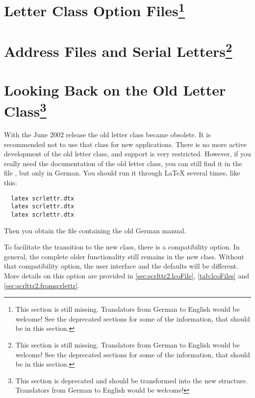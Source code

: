 \section{Letter Class Option Files\protect\footnote{This section is still missing. Translators
    from German to English would be welcome! See the deprecated sections for
    some of the information, that should be in this section.}}
\label{sec:scrlttr2.stillmissing}
\mbox{}

\section{Address Files and Serial Letters\protect\footnote{This section is still missing. Translators
    from German to English would be welcome! See the deprecated sections for
    some of the information, that should be in this section.}}
\label{sec:scrlttr2.stillmissing}
\mbox{}


\section{Looking Back on the Old Letter Class\protect\footnote{This section is
  deprecated and should be transformed into the new structure. Translators
  from German to English would be welcome!}}
\label{sec:scrlttr2.scrlettr}

With the June 2002 release the old letter class
 became obsolete. It is
recommended not to use that class for new applications. There is no
more active development of the old letter class, and support is very
restricted. However, if you really need the documentation of the old
letter class, you can still find it in the file ,
but only in German. You should run it through {\LaTeX} several times,
like this:
\begin{lstlisting}
  latex scrlettr.dtx
  latex scrlettr.dtx
  latex scrlettr.dtx
\end{lstlisting}
Then you obtain the file  containing the old German
manual.

To facilitate the transition to the new class, there is a
compatibility option. In general, the complete older functionality
still remains in the new class.  Without that compatibility option,
the user interface and the defaults will be different. More details on
this option are provided in \autoref{sec:scrlttr2.lcoFile},
\autoref{tab:lcoFiles} and \autoref{sec:scrlttr2.fromscrlettr}.


